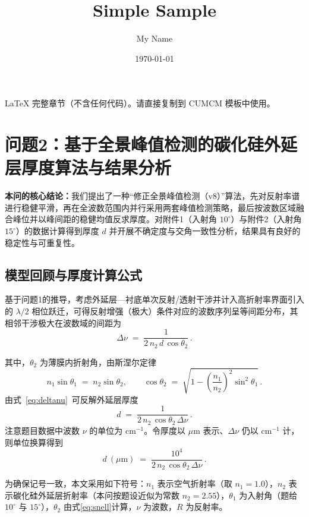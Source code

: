 \documentclass{ctexart} %
\title{Simple Sample} %
\author{My Name} %
\date{\today} %
\begin{document}
\maketitle %
LaTeX 完整章节（不含任何代码）。请直接复制到 CUMCM 模板中使用。

\section{问题2：基于全景峰值检测的碳化硅外延层厚度算法与结果分析}
\textbf{本问的核心结论：}我们提出了一种“修正全景峰值检测（v8）”算法，先对反射率谱进行稳健平滑，再在全波数范围内并行采用两套峰值检测策略，最后按波数区域融合峰位并以峰间距的稳健均值反求厚度。对附件1（入射角 \(10^\circ\)）与附件2（入射角 \(15^\circ\)）的数据计算得到厚度 \(d\) 并开展不确定度与交角一致性分析，结果具有良好的稳定性与可重复性。

\subsection{模型回顾与厚度计算公式}
基于问题1的推导，考虑外延层—衬底单次反射/透射干涉并计入高折射率界面引入的 \(\lambda/2\) 相位跃迁，可得反射增强（极大）条件对应的波数序列呈等间距分布，其相邻干涉极大在波数域的间距为
\begin{equation}
    \Delta \nu \;=\; \frac{1}{2\,n_2\,d\,\cos\theta_2}\,.
    \label{eq:deltanu}
\end{equation}

其中，\(\theta_2\) 为薄膜内折射角，由斯涅尔定律
\begin{equation}
    n_1\sin\theta_1 \;=\; n_2\sin\theta_2,
    \qquad
    \cos\theta_2 \;=\; \sqrt{1-\left(\frac{n_1}{n_2}\right)^2\sin^2\theta_1}\,.
    \label{eq:snell}
\end{equation}
由式~\eqref{eq:deltanu}~可反解外延层厚度
\begin{equation}
    d \;=\; \frac{1}{2\,n_2\,\cos\theta_2\,\Delta \nu}\,.
    \label{eq:d_basic}
\end{equation}
注意题目数据中波数 \(\nu\) 的单位为 \(\mathrm{cm}^{-1}\)。令厚度以 \(\mu\mathrm{m}\) 表示、\(\Delta\nu\) 仍以 \(\mathrm{cm}^{-1}\) 计，则单位换算得到
\begin{equation}
    d~(\mu\mathrm{m}) \;=\; \frac{10^{4}}{2\,n_2\,\cos\theta_2\,\Delta \nu}\,.
    \label{eq:d_um}
\end{equation}

为确保记号一致，本文采用如下符号：\(n_1\) 表示空气折射率（取 \(n_1=1.0\)），\(n_2\) 表示碳化硅外延层折射率（本问按题设近似为常数 \(n_2=2.55\)），\(\theta_1\) 为入射角（题给 \(10^\circ\) 与 \(15^\circ\)），\(\theta_2\) 由式\eqref{eq:snell}计算，\(\nu\) 为波数，\(R\) 为反射率。
\end{document}
